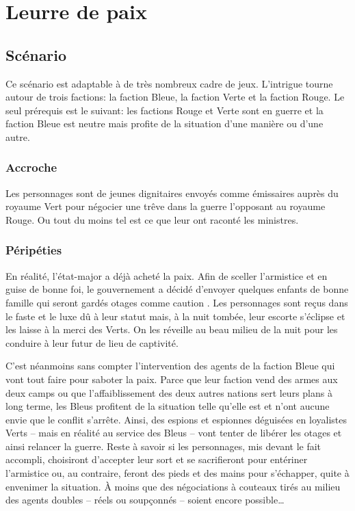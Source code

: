 \chapter{Leurre de paix}

\section{Scénario}

Ce scénario est adaptable à de très nombreux cadre de jeux.
L'intrigue tourne autour de trois factions: la faction Bleue, la faction Verte et la faction Rouge.
Le seul prérequis est le suivant: les factions Rouge et Verte sont en guerre et la faction Bleue est \og neutre \fg mais profite de la situation d'une manière ou d'une autre.

\subsection{Accroche}

Les personnages sont de jeunes dignitaires envoyés comme émissaires auprès du royaume Vert pour négocier une trêve dans la guerre l'opposant au royaume Rouge.
Ou tout du moins tel est ce que leur ont raconté les ministres.

\subsection{Péripéties}

En réalité, l'état-major a déjà acheté la paix.
Afin de sceller l'armistice et en guise de bonne foi, le gouvernement a décidé d'envoyer quelques enfants de bonne famille qui seront gardés otages comme \og caution \fg.
Les personnages sont reçus dans le faste et le luxe dû à leur statut mais, à la nuit tombée, leur escorte s'éclipse et les laisse à la merci des Verts.
On les réveille au beau milieu de la nuit pour les conduire à leur futur de lieu de captivité.

C'est néanmoins sans compter l'intervention des agents de la faction Bleue qui vont tout faire pour saboter la paix.
Parce que leur faction vend des armes aux deux camps ou que l'affaiblissement des deux autres nations sert leurs plans à long terme, les Bleus profitent de la situation telle qu'elle est et n'ont aucune envie que le conflit s'arrête.
Ainsi, des espions et espionnes déguisées en loyalistes Verts -- mais en réalité au service des Bleus -- vont tenter de libérer les otages et ainsi relancer la guerre.
Reste à savoir si les personnages, mis devant le fait accompli, choisiront d'accepter leur sort et se sacrifieront pour entériner l'armistice ou, au contraire, feront des pieds et des mains pour s'échapper, quite à envenimer la situation.
À moins que des négociations à couteaux tirés au milieu des agents doubles -- réels ou soupçonnés -- soient encore possible\dots

